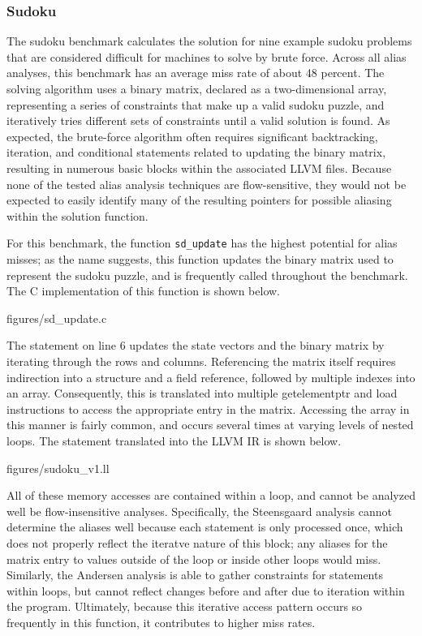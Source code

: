 \subsubsection{Sudoku}
The sudoku benchmark calculates the solution for nine example sudoku problems that are considered difficult for machines to solve by brute force. Across all alias analyses, this benchmark has an average miss rate of about 48 percent. The solving algorithm uses a binary matrix, declared as a two-dimensional array, representing a series of constraints that make up a valid sudoku puzzle, and iteratively tries different sets of constraints until a valid solution is found. As expected, the brute-force algorithm often requires significant backtracking, iteration, and conditional statements related to updating the binary matrix, resulting in numerous basic blocks within the associated LLVM files. Because none of the tested alias analysis techniques are flow-sensitive, they would not be expected to easily identify many of the resulting pointers for possible aliasing within the solution function.

For this benchmark, the function \texttt{sd\_update} has the highest potential for alias misses; as the name suggests, this function updates the binary matrix used to represent the sudoku puzzle, and is frequently called throughout the benchmark. The C implementation of this function is shown below.

 {figures/sd\_update.c}

The statement on line 6 updates the state vectors and the binary matrix by iterating through the rows and columns. Referencing the matrix itself requires indirection into a structure and a field reference, followed by multiple indexes into an array. Consequently, this is translated into multiple getelementptr and load instructions to access the appropriate entry in the matrix. Accessing the array in this manner is fairly common, and occurs several times at varying levels of nested loops. The statement translated into the LLVM IR is shown below.

 {figures/sudoku\_v1.ll}

All of these memory accesses are contained within a loop, and cannot be analyzed well be flow-insensitive analyses. Specifically, the Steensgaard analysis cannot determine the aliases well because each statement is only processed once, which does not properly reflect the iteratve nature of this block; any aliases for the matrix entry to values outside of the loop or inside other loops would miss. Similarly, the Andersen analysis is able to gather constraints for statements within loops, but cannot reflect changes before and after due to iteration within the program. Ultimately, because this iterative access pattern occurs so frequently in this function, it contributes to higher miss rates.

